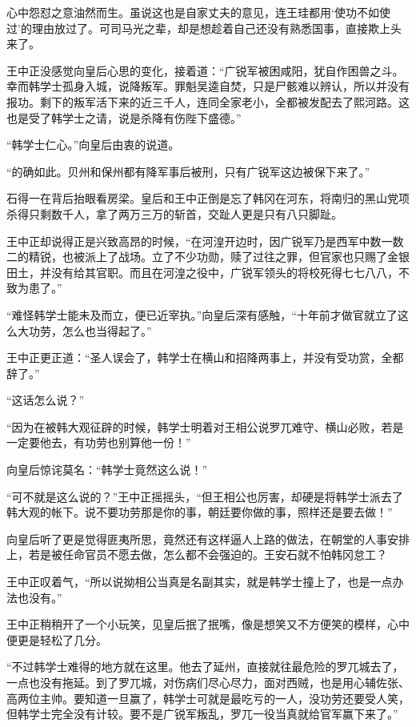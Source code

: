 心中怨怼之意油然而生。虽说这也是自家丈夫的意见，连王珪都用‘使功不如使过’的理由放过了。可司马光之辈，却是想趁着自己还没有熟悉国事，直接欺上头来了。 

王中正没感觉向皇后心思的变化，接着道：“广锐军被困咸阳，犹自作困兽之斗。幸而韩学士孤身入城，说降叛军。罪魁吴逵自焚，只是尸骸难以辨认，所以并没有报功。剩下的叛军活下来的近三千人，连同全家老小，全都被发配去了熙河路。这也是受了韩学士之请，说是杀降有伤陛下盛德。” 

“韩学士仁心。”向皇后由衷的说道。 

“的确如此。贝州和保州都有降军事后被刑，只有广锐军这边被保下来了。” 

石得一在背后抬眼看房梁。皇后和王中正倒是忘了韩冈在河东，将南归的黑山党项杀得只剩数千人，拿了两万三万的斩首，交趾人更是只有八只脚趾。 

王中正却说得正是兴致高昂的时候，“在河湟开边时，因广锐军乃是西军中数一数二的精锐，也被派上了战场。立了不少功勋，赎了过往之罪，但官家也只赐了金银田土，并没有给其官职。而且在河湟之役中，广锐军领头的将校死得七七八八，不致为患了。” 

“难怪韩学士能未及而立，便已近宰执。”向皇后深有感触，“十年前才做官就立了这么大功劳，怎么也当得起了。” 

王中正更正道：“圣人误会了，韩学士在横山和招降两事上，并没有受功赏，全都辞了。” 

“这话怎么说？” 

“因为在被韩大观征辟的时候，韩学士明着对王相公说罗兀难守、横山必败，若是一定要他去，有功劳也别算他一份！” 

向皇后惊诧莫名：“韩学士竟然这么说！” 

“可不就是这么说的？”王中正摇摇头，“但王相公也厉害，却硬是将韩学士派去了韩大观的帐下。说不要功劳那是你的事，朝廷要你做的事，照样还是要去做！” 

向皇后听了更是觉得匪夷所思，竟然还有这样逼人上路的做法，在朝堂的人事安排上，若是被任命官员不愿去做，怎么都不会强迫的。王安石就不怕韩冈怠工？ 

王中正叹着气，“所以说拗相公当真是名副其实，就是韩学士撞上了，也是一点办法也没有。” 

王中正稍稍开了一个小玩笑，见皇后抿了抿嘴，像是想笑又不方便笑的模样，心中便更是轻松了几分。 

“不过韩学士难得的地方就在这里。他去了延州，直接就往最危险的罗兀城去了，一点也没有拖延。到了罗兀城，对伤病们尽心尽力，面对西贼，也是用心辅佐张、高两位主帅。要知道一旦赢了，韩学士可就是最吃亏的一人，没功劳还要受人笑，但韩学士完全没有计较。要不是广锐军叛乱，罗兀一役当真就给官军赢下来了。” 

